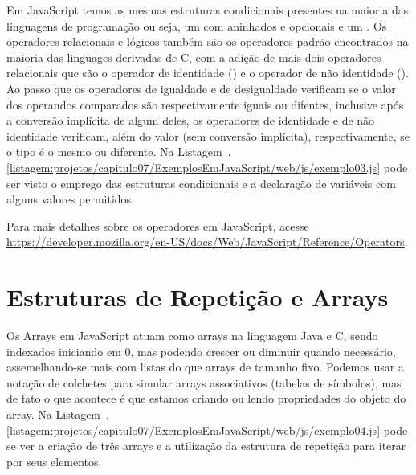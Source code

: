 Em JavaScript temos as mesmas estruturas condicionais presentes na maioria das linguagens de programação ou seja, um  com  aninhados e opcionais e um . Os operadores relacionais e lógicos também são os operadores padrão encontrados na maioria das linguages derivadas de C, com a adição de mais dois operadores relacionais que são o operador de identidade (\inlineJavaScriptCode{===}) e o operador de não identidade (\inlineJavaScriptCode{!==}). Ao passo que os operadores de igualdade e de desigualdade verificam se o valor dos operandos comparados são respectivamente iguais ou difentes, inclusive após a conversão implícita de algum deles, os operadores de identidade e de não identidade verificam, além do valor (sem conversão implícita), respectivamente, se o tipo é o mesmo ou diferente. Na Listagem~\thechapter.\ref{listagem:projetos/capitulo07/ExemplosEmJavaScript/web/js/exemplo03.js} pode ser visto o emprego das estruturas condicionais e a declaração de variáveis com alguns valores permitidos.


\begin{saibaMais}
    Para mais detalhes sobre os operadores em JavaScript, acesse \url{https://developer.mozilla.org/en-US/docs/Web/JavaScript/Reference/Operators}.
\end{saibaMais}


\section{Estruturas de Repetição e Arrays}

Os Arrays em JavaScript atuam como arrays na linguagem Java e C, sendo indexados iniciando em 0, mas podendo crescer ou diminuir quando necessário, assemelhando-se mais com listas do que arrays de tamanho fixo. Podemos usar a notação de colchetes para simular arrays associativos (tabelas de símbolos), mas de fato o que acontece é que estamos criando ou lendo propriedades do objeto do array. Na Listagem~\thechapter.\ref{listagem:projetos/capitulo07/ExemplosEmJavaScript/web/js/exemplo04.js} pode se ver a criação de três arrays e a utilização da estrutura de repetição  para iterar por seus elementos.



